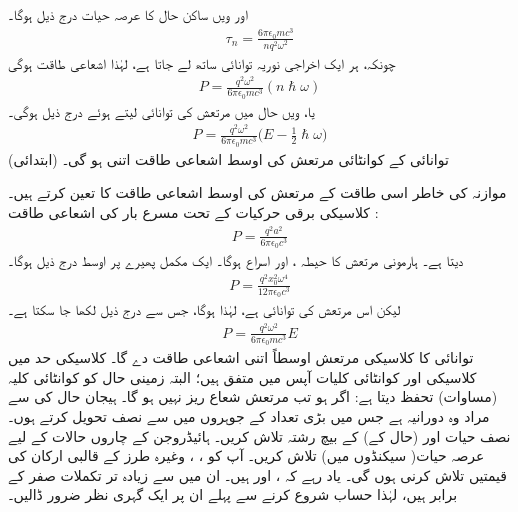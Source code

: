 اور ویں ساکن حال کا عرصہ حیات درج ذیل ہوگا۔
\begin{align}
	\tau_n = \frac{6\pi\epsilon_0mc^3}{nq^2\omega^2}
\end{align}
چونکہ، ہر ایک اخراجی نوریہ  توانائی ساتھ لے جاتا ہے، لہٰذا اشعاعی طاقت  ہوگی
\begin{align*}
	P = \frac{q^2\omega^2}{6\pi\epsilon_0mc^3}(n\hslash\omega)
\end{align*}
یا، ویں حال میں مرتعش کی توانائی  لیتے ہوئے درج ذیل ہوگی۔
\begin{align}\label{مساوات_تابع_مضطرب_زمینی_توانائی_رہے_گی}
	P = \frac{q^2\omega^2}{6\pi\epsilon_0mc^3}\big(E-\frac{1}{2}\hslash\omega\big)
\end{align}
(ابتدائی) توانائی  کے کوانٹائی مرتعش کی اوسط اشعاعی طاقت اتنی ہو گی۔

موازنہ کی خاطر اسی طاقت کے  مرتعش کی اوسط اشعاعی طاقت کا تعین کرتے ہیں۔ کلاسیکی برقی حرکیات کے تحت مسرع بار  کی اشعاعی طاقت :
\begin{align}
	P = \frac{q^2a^2}{6\pi\epsilon_0c^3}
\end{align}
 دیتا ہے۔ ہارمونی مرتعش  کا حیطہ ، اور اسراع  ہوگا۔ ایک مکمل پھیرے پر اوسط درج ذیل ہوگا۔
\begin{align*}
	P = \frac{q^2x^2_0\omega^4}{12\pi\epsilon_0c^3}
\end{align*}
لیکن اس مرتعش کی توانائی  ہے، لہٰذا  ہوگا، جس سے درج ذیل لکھا جا سکتا ہے۔
\begin{align}
	P = \frac{q^2\omega^2}{6\pi\epsilon_0mc^3}E
\end{align}
توانائی  کا کلاسیکی مرتعش اوسطاً اتنی اشعاعی طاقت دے گا۔ کلاسیکی حد  میں کلاسیکی اور کوانٹائی کلیات آپس میں متفق ہیں؛ البتہ زمینی حال کو کوانٹائی کلیہ
 (مساوات) تحفظ دیتا ہے: اگر  ہو تب مرتعش شعاع ریز نہیں ہو گا۔
ہیجان حال کی   سے مراد وہ دورانیہ ہے جس میں بڑی تعداد کے جوہروں میں سے نصف تحویل کرتے ہوں۔ نصف حیات  اور (حال کے)   کے بیچ رشتہ تلاش کریں۔
ہائیڈروجن کے چاروں  حالات کے لیے عرصہ حیات( سیکنڈوں میں) تلاش کریں۔  آپ کو ، ، وغیرہ طرز کے قالبی ارکان کی قیمتیں تلاش کرنی ہوں گی۔ یاد رہے کہ
 ،  اور  ہیں۔ ان میں سے زیادہ تر تکملات صفر کے برابر ہیں، لہٰذا حساب شروع کرنے سے پہلے ان پر ایک گہری نظر ضرور ڈالیں۔

